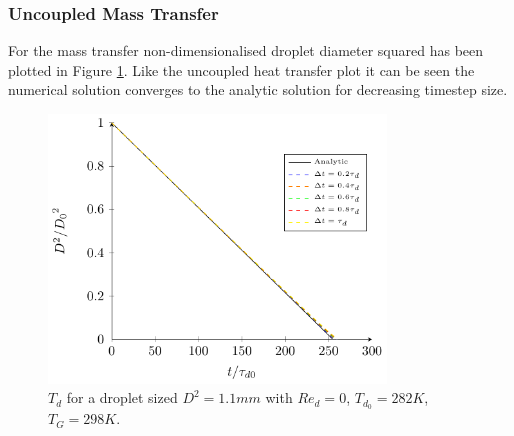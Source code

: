 \documentclass[../Interim_Report_Master]{subfiles}
\begin{document}
\subsubsection{Uncoupled Mass Transfer}\label{sec:uc_mass_opencl}
For the mass transfer non-dimensionalised droplet diameter squared has been plotted in Figure \ref{plot:uc_mass_v_opencl}. Like the uncoupled heat transfer plot it can be seen the numerical solution converges to the analytic solution for decreasing timestep size.
\begin{figure}[H]
	\centering
	\includegraphics[width=0.8\textwidth]{./Diagrams/Uncoupled_Mass_Transfer_Verification/Uncoupled_Mass_Transfer.pdf}
	\caption{$T_d$ for a droplet sized $D^2=1.1mm$ with $Re_d=0$, $T_{d_0}=282K$, $T_G=298K$.}
	\label{plot:uc_mass_v_opencl}
\end{figure}
\end{document}
